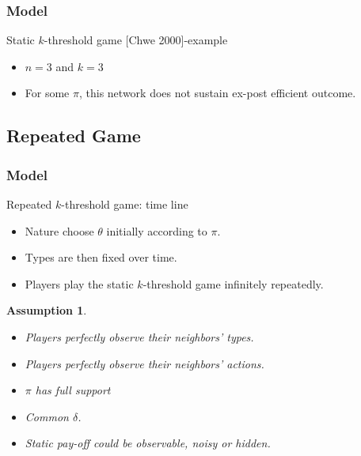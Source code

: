 \documentclass[9pt]{beamer}
\newtheorem{assumption}{Assumption}[section]
\begin{document}
\begin{frame}
  \frametitle{Model}
Static $k$-threshold game [Chwe 2000]-example

\begin{itemize}
\item $n=3$ and $k=3$
\end{itemize}

\begin{center}
\end{center}


\begin{itemize}
\item For some $\pi$, this network does not sustain ex-post efficient outcome.
\end{itemize}

\end{frame}




\subsection{Repeated Game}


\begin{frame}
  \frametitle{Model}
Repeated $k$-threshold game: time line
  \begin{itemize}

  \item Nature choose $\theta$ initially according to $\pi$.

  \item Types are then fixed over time.

  \item Players play the static $k$-threshold game infinitely repeatedly.


  \end{itemize}

\begin{assumption}
\begin{itemize}
    \item Players perfectly observe their neighbors' types.
\item Players perfectly observe their neighbors' actions. 
  \item $\pi$ has full support

\item Common $\delta$. 
\item Static pay-off could be observable, noisy or hidden.
\end{itemize}

\end{assumption}

\end{frame}
\end{document}

